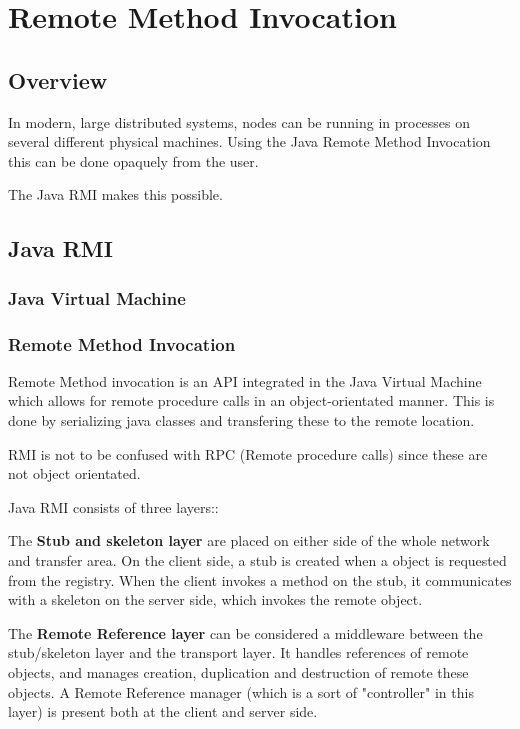 \chapter{Remote Method Invocation}
\section{Overview}
In modern, large distributed systems, nodes can be running in processes on several different physical machines. Using the Java Remote Method Invocation this can be done opaquely from the user. 

The Java RMI makes this possible. 

\section{Java RMI}

\subsection{Java Virtual Machine}

\subsection{Remote Method Invocation}

Remote Method invocation is an API integrated in the Java Virtual Machine which allows for remote procedure calls in an object-orientated manner. This is done by serializing java classes and transfering these to the remote location.

RMI is not to be confused with RPC (Remote procedure calls) since these are not object orientated.

Java RMI consists of three layers::

The \textbf{Stub and skeleton layer} are placed on either side of the whole network and transfer area. On the client side, a stub is created when a object is requested from the registry. When the client invokes a method on the stub, it communicates with a skeleton on the server side, which invokes the remote object.

The \textbf{Remote Reference layer} can be considered a middleware between the stub/skeleton layer and the transport layer. It handles references of remote objects, and manages creation, duplication and destruction of remote these objects. A Remote Reference manager (which is a sort of "controller" in this layer) is present both at the client and server side.


